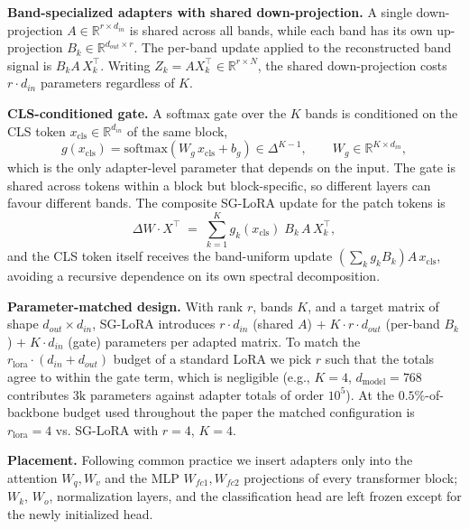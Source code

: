 \documentclass{article}
\begin{document}
\textbf{Band-specialized adapters with shared down-projection.} A single down-projection $A \in \mathbb{R}^{r \times d_{in}}$ is shared across all bands, while each band has its own up-projection $B_k \in \mathbb{R}^{d_{out} \times r}$. The per-band update applied to the reconstructed band signal is $B_k A \, X_k^\top$. Writing $Z_k = A X_k^\top \in \mathbb{R}^{r \times N}$, the shared down-projection costs $r \cdot d_{in}$ parameters regardless of $K$.

\textbf{CLS-conditioned gate.} A softmax gate over the $K$ bands is conditioned on the CLS token $x_{\mathrm{cls}} \in \mathbb{R}^{d_{in}}$ of the same block,
\begin{equation}
g(x_{\mathrm{cls}}) = \mathrm{softmax}\!\left(W_g \, x_{\mathrm{cls}} + b_g\right) \in \Delta^{K-1}, \qquad W_g \in \mathbb{R}^{K \times d_{in}},
\end{equation}
which is the only adapter-level parameter that depends on the input. The gate is shared across tokens within a block but block-specific, so different layers can favour different bands. The composite SG-LoRA update for the patch tokens is
\begin{equation}
\Delta W \cdot X^\top \;=\; \sum_{k=1}^{K} g_k(x_{\mathrm{cls}}) \; B_k \, A \, X_k^\top,
\end{equation}
and the CLS token itself receives the band-uniform update $\left(\sum_k g_k B_k\right) A \, x_{\mathrm{cls}}$, avoiding a recursive dependence on its own spectral decomposition.

\textbf{Parameter-matched design.} With rank $r$, bands $K$, and a target matrix of shape $d_{out} \times d_{in}$, SG-LoRA introduces $r \cdot d_{in}$ (shared $A$) $+ \; K \cdot r \cdot d_{out}$ (per-band $B_k$) $+ \; K \cdot d_{in}$ (gate) parameters per adapted matrix. To match the $r_{\mathrm{lora}} \cdot (d_{in} + d_{out})$ budget of a standard LoRA we pick $r$ such that the totals agree to within the gate term, which is negligible (e.g., $K = 4$, $d_{\mathrm{model}} = 768$ contributes $3\text{k}$ parameters against adapter totals of order $10^5$). At the $0.5\%$-of-backbone budget used throughout the paper the matched configuration is $r_{\mathrm{lora}} = 4$ vs. SG-LoRA with $r = 4$, $K = 4$.

\textbf{Placement.} Following common practice we insert adapters only into the attention $W_q, W_v$ and the MLP $W_{fc1}, W_{fc2}$ projections of every transformer block; $W_k$, $W_o$, normalization layers, and the classification head are left frozen except for the newly initialized head.
\end{document}
